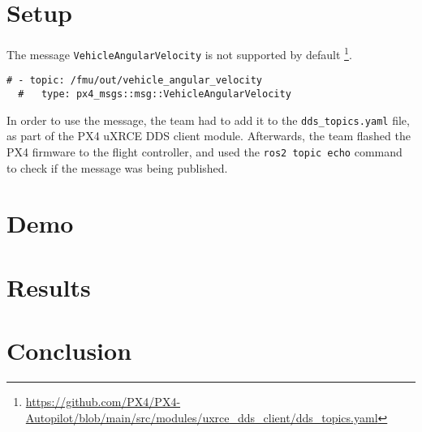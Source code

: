 \documentclass[a4paper]{article}
\begin{document}
\clearpage
\section{Setup}

The message \verb|VehicleAngularVelocity| is not supported by default \footnote{\url{https://github.com/PX4/PX4-Autopilot/blob/main/src/modules/uxrce_dds_client/dds_topics.yaml}}. 

\begin{lstlisting}[caption=Message Not Supported for uXRCE DDS Client Module in PX4]
  # - topic: /fmu/out/vehicle_angular_velocity
  #   type: px4_msgs::msg::VehicleAngularVelocity
\end{lstlisting}

In order to use the message, the team had to add it to the \verb|dds_topics.yaml| file, as part of the PX4 uXRCE DDS client module. Afterwards, the team flashed the PX4 firmware to the flight controller, and used the \verb|ros2 topic echo| command to check if the message was being published. 

\clearpage
\section{Demo}
\label{sec::demo}



\clearpage
\section{Results}



\clearpage
\section{Conclusion}



\end{document}

